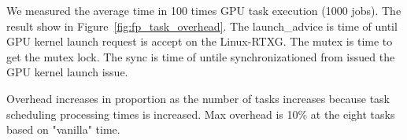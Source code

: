 We measured the average time in 100 times GPU task execution (1000 jobs).
The result show in Figure~\ref{fig:fp_task_overhead}.
The launch\_advice is time of until GPU kernel launch request is accept on the Linux-RTXG.
The mutex is time to get the mutex lock.
The sync is time of untile synchronizationed from issued the GPU kernel launch issue.
\fi

Overhead increases in proportion as the number of tasks increases because task scheduling processing times is increased.
Max overhead is 10\% at the eight tasks based on "vanilla" time.



%




